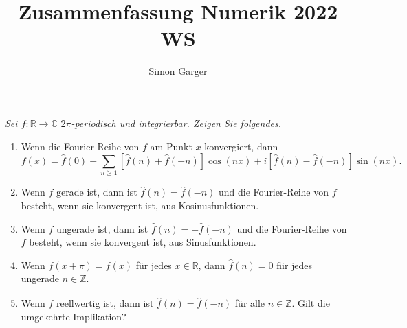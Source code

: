 \documentclass[11pt]{article}
\title{Zusammenfassung Numerik 2022 WS}
\author{Simon Garger}
\newenvironment{problem}[2][Beispiel]{
    \begin{trivlist}
        \item[\hskip \labelsep {\bfseries #1}\hskip \labelsep {\bfseries #2.}] \itshape}{
    \end{trivlist}\normalshape
}
\begin{document}
    \begin{problem}{1}
        Sei $f: \mathbb{R} \rightarrow \mathbb{C} \,\,2 \pi$-periodisch und integrierbar. Zeigen Sie
        folgendes.
        \begin{enumerate}[label = (\alph*)]
            \item Wenn die Fourier-Reihe von $f$ am Punkt $x$ konvergiert, dann
            $$
            f(x)=\hat{f}(0)+\sum_{n \geq 1}[\hat{f}(n)+\hat{f}(-n)] \cos (n x)+i[\hat{f}(n)-\hat{f}(-n)]
            \sin (n x) .
            $$
            \item Wenn $f$ gerade ist, dann ist $\hat{f}(n)=\hat{f}(-n)$ und die Fourier-Reihe von
            $f$ besteht, wenn sie konvergent ist, aus Kosinusfunktionen.
            \item Wenn $f$ ungerade ist, dann ist $\hat{f}(n)=-\hat{f}(-n)$ und die Fourier-Reihe von
            $f$ besteht, wenn sie konvergent ist, aus Sinusfunktionen.
            \item Wenn $f(x+\pi)=f(x)$ für jedes $x \in \mathbb{R}$, dann $\hat{f}(n)=0$ fiir jedes ungerade
            $n \in \mathbb{Z}$.
            \item Wenn $f$ reellwertig ist, dann ist $\hat{f}(n)=\overline{\hat{f}(-n)}$ für alle
            $n \in \mathbb{Z}$. Gilt die umgekehrte Implikation?
        \end{enumerate}
    \end{problem}
\end{document}
